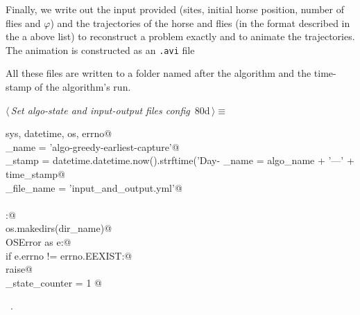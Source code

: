 \documentclass[11.5pt]{report}
\begin{document}
Finally, we write out the input provided (sites, initial horse position, number of flies and $\varphi$) and 
the trajectories of the horse and flies (in the format described in the a above list) to reconstruct a 
problem exactly and to animate the trajectories. The animation is constructed as an \verb|.avi| file

All these files are written to a folder named after the
algorithm and the time-stamp of the algorithm's run. 

\begin{flushleft} \small\label{scrap127}\raggedright\small
{} $\langle\,${\itshape Set algo-state and input-output files config}\nobreak\ {\footnotesize {80d}}$\,\rangle\equiv$
\vspace{-1ex}
\begin{list}{}{} \item
\mbox{}\verb@import sys, datetime, os, errno@\\
\mbox{}\verb@algo_name     = 'algo-greedy-earliest-capture'@\\
\mbox{}\verb@time_stamp    = datetime.datetime.now().strftime('Day-%Y-%m-%d_ClockTime-%H:%M:%S')@\\
\mbox{}\verb@dir_name      = algo_name + '---' + time_stamp@\\
\mbox{}\verb@io_file_name  = 'input_and_output.yml'@\\
\mbox{}\verb@@\\
\mbox{}\verb@try:@\\
\mbox{}\verb@    os.makedirs(dir_name)@\\
\mbox{}\verb@except OSError as e:@\\
\mbox{}\verb@    if e.errno != errno.EEXIST:@\\
\mbox{}\verb@        raise@\\
\mbox{}\verb@algo_state_counter = 1 @\\
\mbox{}\verb@@{\NWsep}
\end{list}
\vspace{-1.5ex}
\footnotesize
\begin{list}{}{\setlength{\itemsep}{-\parsep}\setlength{\itemindent}{-\leftmargin}}
\item \NWtxtMacroRefIn\ .

\item{}
\end{list}
\vspace{4ex}
\end{flushleft}
\end{document}
